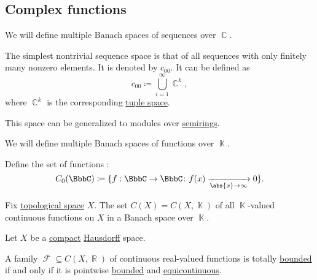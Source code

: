 \subsection{Complex functions}\label{subsec:complex_functions}

\begin{definition}\label{def:sequence_spaces}
  We will define multiple Banach spaces of sequences over \( \BbbC \).

  \begin{thmenum}
     The simplest nontrivial sequence space is that of all sequences with only finitely many nonzero elements. It is denoted by \( c_{00} \). It can be defined as
    \begin{equation*}
      c_{00} \coloneqq \bigcup_{i=1}^\infty \BbbC^k,
    \end{equation*}
    where \( \BbbC^k \) is the corresponding \hyperref[def:module_of_tuples]{tuple space}.

    This space can be generalized to modules over \hyperref[def:module]{semirings}.
  \end{thmenum}
\end{definition}

\begin{definition}\label{def:function_spaces}
  We will define multiple Banach spaces of functions over \( \BbbK \).

  \begin{thmenum}
     Define the set of functions :
    \begin{equation*}
      C_0(\BbbC) \coloneqq \{ f: \BbbC \to \BbbC \colon f(x) \xrightarrow[\abs{x} \to \infty]{} 0 \}.
    \end{equation*}

     Fix \hyperref[def:topological_space]{topological space} \( X \). The set \( C(X) = C(X, \BbbK) \) of all \( \BbbK \)-valued continuous functions on \( X \) in a Banach space over \( \BbbK \).
  \end{thmenum}
\end{definition}

\begin{theorem}\label{thm:arzela_ascoli}
  Let \( X \) be a \hyperref[def:compact_space]{compact} \hyperref[def:separation_axioms/T2]{Hausdorff} space.

  A family \( \mscrF \subseteq C(X, \BbbR) \) of continuous real-valued functions is totally \hyperref[def:totally_bounded_set]{bounded} if and only if it is pointwise \hyperref[def:bounded_function/pointwise]{bounded} and \hyperref[def:function_set_continuity/equicontinuous]{equicontinuous}.
\end{theorem}
